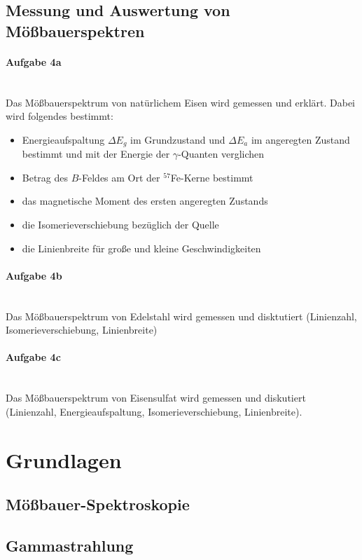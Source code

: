 \documentclass[a4paper,twoside,final]{article}
\begin{document}
\subsection{Messung und Auswertung von Mößbauerspektren}
\paragraph{Aufgabe 4a}$~$\\
Das Mößbauerspektrum von natürlichem Eisen wird gemessen und erklärt.
Dabei wird folgendes bestimmt:
\begin{itemize}
  \item Energieaufspaltung $\Delta E_g$ im Grundzustand und $\Delta E_a$ im angeregten Zustand bestimmt und mit der Energie der $\gamma$-Quanten verglichen
  \item Betrag des $B$-Feldes am Ort der $^{57}$Fe-Kerne bestimmt
  \item das magnetische Moment des ersten angeregten Zustands
  \item die Isomerieverschiebung bezüglich der Quelle
  \item die Linienbreite für große und kleine Geschwindigkeiten
\end{itemize}
\paragraph{Aufgabe 4b}$~$\\
Das Mößbauerspektrum von Edelstahl wird gemessen und disktutiert (Linienzahl, Isomerieverschiebung, Linienbreite)
\paragraph{Aufgabe 4c}$~$\\
Das Mößbauerspektrum von Eisensulfat wird gemessen und diskutiert (Linienzahl, Energieaufspaltung, Isomerieverschiebung, Linienbreite).
\newpage
\section{Grundlagen} \label{sec:Grundlagen}
\subsection{Mößbauer-Spektroskopie}
\subsection{Gammastrahlung}
\end{document}
